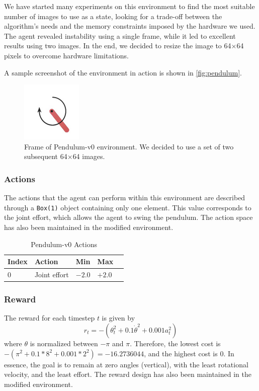 We have started many experiments on this environment to find the most suitable number of images to use as a state, looking for a trade-off between the algorithm’s needs and the memory constraints imposed by the hardware we used.
The agent revealed instability using a single frame, while it led to excellent results using two images.
In the end, we decided to resize the image to 64$\times$64 pixels to overcome hardware limitations.

A sample screenshot of the environment in action is shown in \vref{fig:pendulum}.

\begin{figure}[ht!]
	\centering
	\includegraphics[height=0.2\paperwidth]{img/pendulum.png}
	\caption[Frame of Pendulum-v0 environment]{Frame of Pendulum-v0 environment.
		We decided to use a set of two subsequent 64$\times$64 images.}
	\label{fig:pendulum}
\end{figure}

\subsubsection{Actions}

The actions that the agent can perform within this environment are described through a \texttt{Box(1)} object containing only one element.
This value corresponds to the joint effort, which allows the agent to swing the pendulum.
The action space has also been maintained in the modified environment.

\begin{table}[!h]
	\centering
	\caption{Pendulum-v0 Actions }
	\label{mountain_action}
	\begin{tabular}{@{}lllll@{}}
		\toprule
		Index & Action       & Min    & Max    \\ \midrule
		0     & Joint effort & $-2.0$ & $+2.0$ \\
		\bottomrule
	\end{tabular}
\end{table}

\subsubsection{Reward}
The reward for each timestep $t$ is given by \[r_t = -(\theta_t^2 + 0.1 \dot{\theta}^2 + 0.001 a_t^2)\]
where $\theta$ is normalized between $-\pi$ and $\pi$.
Therefore, the lowest cost is $-(\pi^2 + 0.1*8^2 + 0.001*2^2) = -16.2736044$, and the highest cost is $0$.
In essence, the goal is to remain at zero angles (vertical), with the least rotational velocity, and the least effort.
The reward design has also been maintained in the modified environment.

